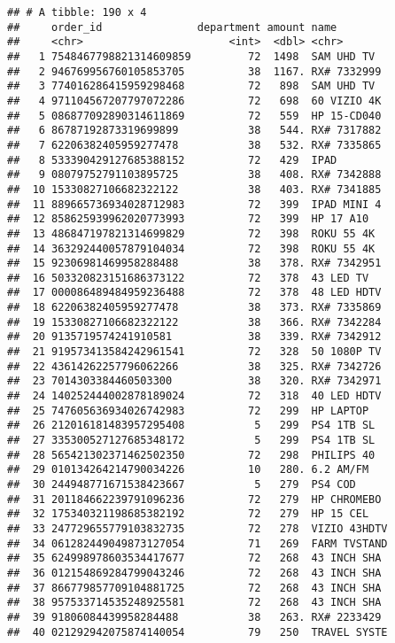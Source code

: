 \documentclass[]{article}
\begin{document}
\begin{verbatim}
## # A tibble: 190 x 4
##     order_id               department amount name        
##     <chr>                       <int>  <dbl> <chr>       
##   1 7548467798821314609859         72  1498  SAM UHD TV  
##   2 946769956760105853705          38  1167. RX# 7332999 
##   3 774016286415959298468          72   898  SAM UHD TV  
##   4 971104567207797072286          72   698  60 VIZIO 4K 
##   5 086877092890314611869          72   559  HP 15-CD040 
##   6 86787192873319699899           38   544. RX# 7317882 
##   7 62206382405959277478           38   532. RX# 7335865 
##   8 533390429127685388152          72   429  IPAD        
##   9 08079752791103895725           38   408. RX# 7342888 
##  10 15330827106682322122           38   403. RX# 7341885 
##  11 889665736934028712983          72   399  IPAD MINI 4 
##  12 858625939962020773993          72   399  HP 17 A10   
##  13 486847197821314699829          72   398  ROKU 55 4K  
##  14 363292440057879104034          72   398  ROKU 55 4K  
##  15 92306981469958288488           38   378. RX# 7342951 
##  16 503320823151686373122          72   378  43 LED TV   
##  17 000086489484959236488          72   378  48 LED HDTV 
##  18 62206382405959277478           38   373. RX# 7335869 
##  19 15330827106682322122           38   366. RX# 7342284 
##  20 9135719574241910581            38   339. RX# 7342912 
##  21 919573413584242961541          72   328  50 1080P TV 
##  22 43614262257796062266           38   325. RX# 7342726 
##  23 7014303384460503300            38   320. RX# 7342971 
##  24 140252444002878189024          72   318  40 LED HDTV 
##  25 747605636934026742983          72   299  HP LAPTOP   
##  26 212016181483957295408           5   299  PS4 1TB SL  
##  27 335300527127685348172           5   299  PS4 1TB SL  
##  28 565421302371462502350          72   298  PHILIPS 40  
##  29 010134264214790034226          10   280. 6.2 AM/FM   
##  30 244948771671538423667           5   279  PS4 COD     
##  31 201184662239791096236          72   279  HP CHROMEBO 
##  32 175340321198685382192          72   279  HP 15 CEL   
##  33 247729655779103832735          72   278  VIZIO 43HDTV
##  34 061282449049873127054          71   269  FARM TVSTAND
##  35 624998978603534417677          72   268  43 INCH SHA 
##  36 012154869284799043246          72   268  43 INCH SHA 
##  37 866779857709104881725          72   268  43 INCH SHA 
##  38 957533714535248925581          72   268  43 INCH SHA 
##  39 91806084439958284488           38   263. RX# 2233429 
##  40 021292942075874140054          79   250  TRAVEL SYSTE

\end{verbatim}
\end{document}
